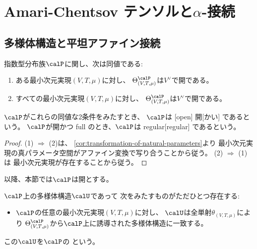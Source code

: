 \documentclass[report]{jlreq}
\begin{document}
%
\section{Amari-Chentsov テンソルと$\alpha$-接続}


\subsection{多様体構造と平坦アファイン接続}

\begin{propdef}
    指数型分布族$\calP$に関し、次は同値である:
    \begin{enumerate}
        \item ある最小次元実現$(V, T, \mu)$に対し、
            $\Theta^\calP_{(V, T, \mu)}$は$V^\vee$で開である。
        \item すべての最小次元実現$(V, T, \mu)$に対し、
            $\Theta^\calP_{(V, T, \mu)}$は$V^\vee$で開である。
    \end{enumerate}
    $\calP$がこれらの同値な2条件をみたすとき、
    $\calP$は
    [open]
        {開}[かい]
    であるという。
    $\calP$が開かつ full のとき、$\calP$は
        {regular}[regular]
    であるという。
\end{propdef}

\begin{proof}
    (1) $\Rightarrow$ (2)は、
    \cref{cor:transformation-of-natural-parameters}より
    最小次元実現の真パラメータ空間がアファイン変換で写り合うことから従う。
    (2) $\Rightarrow$ (1)は
    最小次元実現が存在することから従う。
\end{proof}

以降、本節では$\calP$は開とする。

\begin{propdef}
    $\calP$上の多様体構造$\calU$であって
    次をみたすものがただひとつ存在する:
    \begin{itemize}
        \item $\calP$の任意の最小次元実現$(V, T, \mu)$に対し、
            $\calU$は全単射$\theta_{(V, T, \mu)}$により
            $\Theta^\calP_{(V, T, \mu)}$から$\calP$上に誘導された多様体構造に一致する。
    \end{itemize}
    この$\calU$を$\calP$の
    という。
\end{propdef}
\end{document}
